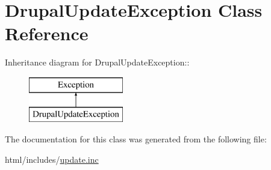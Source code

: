 \hypertarget{classDrupalUpdateException}{
\section{DrupalUpdateException Class Reference}
\label{classDrupalUpdateException}
}
Inheritance diagram for DrupalUpdateException::\begin{figure}[H]
\begin{center}
\leavevmode
\includegraphics[height=2cm]{classDrupalUpdateException}
\end{center}
\end{figure}


The documentation for this class was generated from the following file:\begin{DoxyCompactItemize}
\item 
html/includes/\hyperlink{update_8inc}{update.inc}\end{DoxyCompactItemize}
